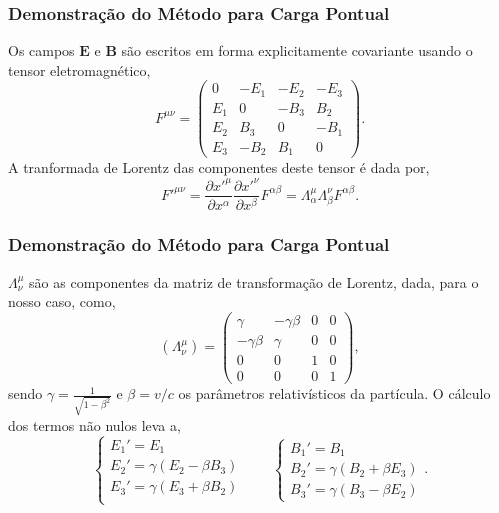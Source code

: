 \documentclass[xcolor=dvipsnames]{beamer}
\renewcommand{\vec}{\mathbf}
\begin{document}
\begin{frame}
	\frametitle{Demonstração do Método para Carga Pontual}
	Os campos $\vec{E}$ e $\vec{B}$ são escritos em forma explicitamente
	covariante usando o tensor eletromagnético,
	\begin{equation}
		F^{\mu \nu} = \begin{pmatrix}
			0 & -E_1 & -E_2 & -E_3 \\
			E_1 & 0 & -B_3 & B_2 \\
			E_2 & B_3 & 0 & -B_1 \\
			E_3 & -B_2 & B_1 & 0
		\end{pmatrix}.
	\end{equation}
	A tranformada de Lorentz das componentes deste tensor é dada por,
	\begin{equation}
		{F'}^{\mu \nu} = \frac{\partial {x'}^\mu}{\partial x^ \alpha}
		\frac{\partial {x'}^\nu}{\partial x^\beta}F^{\alpha \beta} = \Lambda
		^\mu _\alpha \Lambda ^\nu _\beta F^{\alpha \beta}.
	\end{equation}
\end{frame}

\begin{frame}
	\frametitle{Demonstração do Método para Carga Pontual}
	$\Lambda^\mu _\nu$ são as componentes da matriz de transformação de Lorentz,
	dada, para o nosso caso, como,
	\begin{equation}
		(\Lambda ^\mu _\nu) = \begin{pmatrix}
			\gamma & -\gamma \beta & 0 & 0 \\
			-\gamma \beta & \gamma & 0 & 0 \\
			0 & 0 & 1 & 0 \\
			0 & 0 & 0 & 1
		\end{pmatrix},
	\end{equation}
	sendo $\displaystyle \gamma = \frac{1}{\sqrt{1-\beta ^2}}$ e $\beta = v/c$
	os parâmetros relativísticos da partícula. O cálculo dos termos não nulos
	leva a,
	\begin{equation}
		\label{eq_field_trans}
		\begin{cases}
		E_1' = E_1 \\
		E_2' = \gamma (E_2 - \beta B_3) \\
		E_3' = \gamma (E_3 + \beta B_2) \\
		\end{cases} \qquad
		\begin{cases}
		B_1 ' = B_1 \\
		B_2 ' = \gamma (B_2 + \beta E_3) \\
		B_3' = \gamma(B_3 - \beta E_2)
		\end{cases}.
	\end{equation}
\end{frame}
\end{document}
